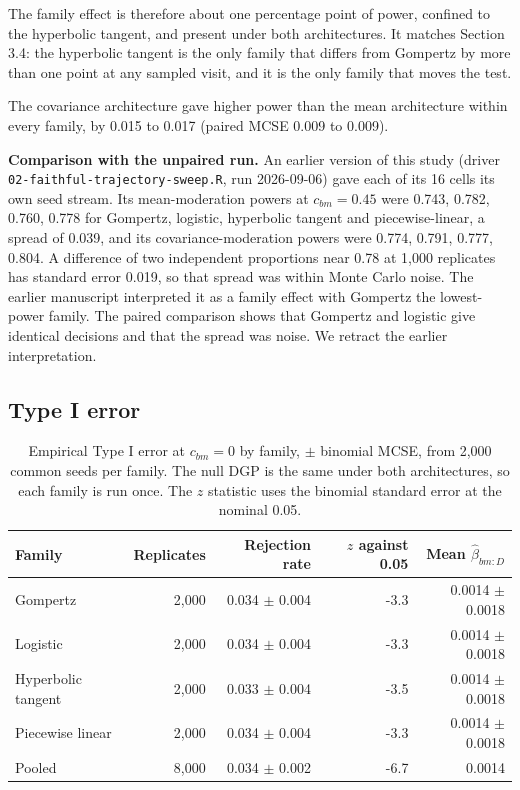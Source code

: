 \documentclass[
  11pt,
]{article}
\begin{document}
The family effect is therefore about one percentage point of power,
confined to the hyperbolic tangent, and present under both
architectures. It matches Section 3.4: the hyperbolic tangent is the
only family that differs from Gompertz by more than one point at any
sampled visit, and it is the only family that moves the test.

The covariance architecture gave higher power than the mean architecture within every family, by 0.015 to 0.017 (paired MCSE 0.009 to 0.009).

\textbf{Comparison with the unpaired run.} An earlier version of this study
(driver \texttt{02-faithful-trajectory-sweep.R}, run 2026-09-06) gave each of
its 16 cells its own seed stream.
Its mean-moderation powers at \(c_{bm} = 0.45\) were 0.743, 0.782, 0.760, 0.778 for Gompertz, logistic, hyperbolic tangent and piecewise-linear, a spread of 0.039, and its covariance-moderation powers were 0.774, 0.791, 0.777, 0.804.
A difference of two independent proportions near 0.78 at 1,000
replicates has standard error 0.019, so that spread was within Monte
Carlo noise. The earlier manuscript interpreted it as a family effect
with Gompertz the lowest-power family. The paired comparison shows that
Gompertz and logistic give identical decisions and that the spread was
noise. We retract the earlier interpretation.

\subsection{Type I error}\label{type-i-error}

\begin{table}

\caption{\label{tab:tab-null}Empirical Type I error at $c_{bm} = 0$ by family, $\pm$ binomial MCSE, from 2,000 common seeds per family. The null DGP is the same under both architectures, so each family is run once. The $z$ statistic uses the binomial standard error at the nominal 0.05.}
\centering
\begin{tabular}[t]{lrrrr}
\toprule
Family & Replicates & Rejection rate & $z$ against 0.05 & Mean $\hat\beta_{bm:D}$\\
\midrule
Gompertz & 2,000 & 0.034 $\pm$ 0.004 & -3.3 & 0.0014 $\pm$ 0.0018\\
Logistic & 2,000 & 0.034 $\pm$ 0.004 & -3.3 & 0.0014 $\pm$ 0.0018\\
Hyperbolic tangent & 2,000 & 0.033 $\pm$ 0.004 & -3.5 & 0.0014 $\pm$ 0.0018\\
Piecewise linear & 2,000 & 0.034 $\pm$ 0.004 & -3.3 & 0.0014 $\pm$ 0.0018\\
Pooled & 8,000 & 0.034 $\pm$ 0.002 & -6.7 & 0.0014\\
\bottomrule
\end{tabular}
\end{table}
\end{document}
